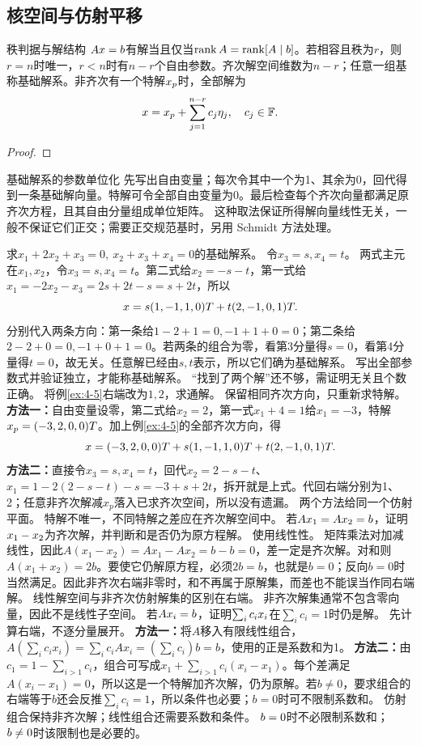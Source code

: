 \subsection{核空间与仿射平移}
\begin{theorem}{秩判据与解结构}
$Ax=b$有解当且仅当$\operatorname{rank} A=\operatorname{rank}[A\mid b]$。若相容且秩为$r$，则$r=n$时唯一，$r<n$时有$n-r$个自由参数。齐次解空间维数为$n-r$；任意一组基称基础解系。非齐次有一个特解$x_p$时，全部解为
\begin{equation}x=x_p+\sum_{j=1}^{n-r}c_j\eta_j,\quad c_j\in\mathbb{F}.\label{eq:general}\end{equation}
\end{theorem}
\begin{proof}

\end{proof}
\begin{method}{基础解系的参数单位化}
先写出自由变量；每次令其中一个为1、其余为0，回代得到一条基础解向量。特解可令全部自由变量为0。最后检查每个齐次向量都满足原齐次方程，且其自由分量组成单位矩阵。
这种取法保证所得解向量线性无关，一般不保证它们正交；需要正交规范基时，另用 Schmidt 方法处理。
\end{method}
{求$x_1+2x_2+x_3=0,\ x_2+x_3+x_4=0$的基础解系。}
{令$x_3=s,x_4=t$。}
{两式主元在$x_1,x_2$，令$x_3=s,x_4=t$。第二式给$x_2=-s-t$，第一式给$x_1=-2x_2-x_3=2s+2t-s=s+2t$，所以
\[x=s(1,-1,1,0)T+t(2,-1,0,1)T.\]
分别代入两条方向：第一条给$1-2+1=0,-1+1+0=0$；第二条给$2-2+0=0,-1+0+1=0$。若两条的组合为零，看第3分量得$s=0$，看第4分量得$t=0$，故无关。任意解已经由$s,t$表示，所以它们确为基础解系。}
{写出全部参数式并验证独立，才能称基础解系。}
{“找到了两个解”还不够，需证明无关且个数正确。}
{将例\ref{ex:4-5}右端改为$1,2$，求通解。}
{保留相同齐次方向，只重新求特解。}
{\textbf{方法一：}自由变量设零，第二式给$x_2=2$，第一式$x_1+4=1$给$x_1=-3$，特解$x_p=(-3,2,0,0)T$。加上例\ref{ex:4-5}的全部齐次方向，得
\[x=(-3,2,0,0)T+s(1,-1,1,0)T+t(2,-1,0,1)T.\]
\textbf{方法二：}直接令$x_3=s,x_4=t$，回代$x_2=2-s-t$、$x_1=1-2(2-s-t)-s=-3+s+2t$，拆开就是上式。代回右端分别为1、2；任意非齐次解减$x_p$落入已求齐次空间，所以没有遗漏。}
{两个方法给同一个仿射平面。}
{特解不唯一，不同特解之差应在齐次解空间中。}
{若$Ax_1=Ax_2=b$，证明$x_1-x_2$为齐次解，并判断和是否仍为原方程解。}
{使用线性性。}
{矩阵乘法对加减线性，因此$A(x_1-x_2)=Ax_1-Ax_2=b-b=0$，差一定是齐次解。对和则$A(x_1+x_2)=2b$。要使它仍解原方程，必须$2b=b$，也就是$b=0$；反向$b=0$时当然满足。因此非齐次右端非零时，和不再属于原解集，而差也不能误当作同右端解。}
{线性解空间与非齐次仿射解集的区别在右端。}
{非齐次解集通常不包含零向量，因此不是线性子空间。}
{若$Ax_i=b$，证明$\sum_i c_ix_i$在$\sum_i c_i=1$时仍是解。}
{先计算右端，不逐分量展开。}
{\textbf{方法一：}将$A$移入有限线性组合，$A(\sum_i c_ix_i)=\sum_i c_iAx_i=(\sum_i c_i)b=b$，使用的正是系数和为1。
\textbf{方法二：}由$c_1=1-\sum_{i>1}c_i$，组合可写成$x_1+\sum_{i>1}c_i(x_i-x_1)$。每个差满足$A(x_i-x_1)=0$，所以这是一个特解加齐次解，仍为原解。若$b\ne0$，要求组合的右端等于$b$还会反推$\sum_i c_i=1$，所以条件也必要；$b=0$时可不限制系数和。}
{仿射组合保持非齐次解；线性组合还需要系数和条件。}
{$b=0$时不必限制系数和；$b\ne0$时该限制也是必要的。}
